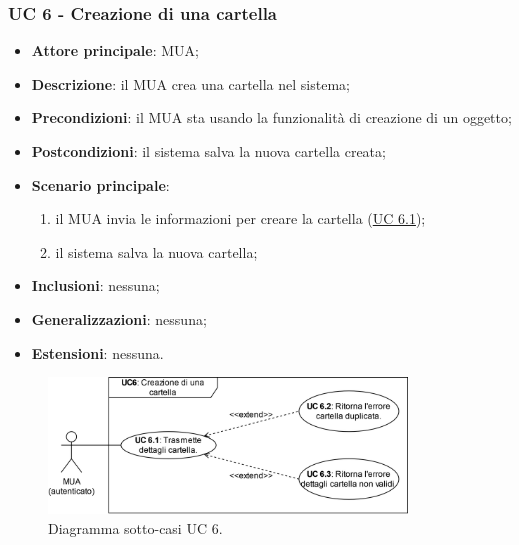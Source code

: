 \subsubsection{UC 6 - Creazione di una cartella} \label{sec:UC6}
    \begin{itemize}
        \item \textbf{Attore principale}: MUA;
        \item \textbf{Descrizione}: il MUA crea una cartella nel sistema;
        \item \textbf{Precondizioni}: il MUA sta usando la funzionalità di creazione di un oggetto;
        \item \textbf{Postcondizioni}: il sistema salva la nuova cartella creata;
        \item \textbf{Scenario principale}:
            \begin{enumerate}
                \item il MUA invia le informazioni per creare la cartella (\hyperref[sec:UC6.1]{UC 6.1});
                \item il sistema salva la nuova cartella;
            \end{enumerate}
        \item \textbf{Inclusioni}: nessuna;
        \item \textbf{Generalizzazioni}: nessuna;
        \item \textbf{Estensioni}: nessuna.
    \end{itemize}

\begin{figure}[h]
    \includegraphics[width=0.85\textwidth]{sections/uc_imgs/UC06.X.png}
    \centering
    \caption{Diagramma sotto-casi UC 6.}
\end{figure}

